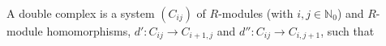 A double complex is a system $(C_{ij})$ of $R$-modules (with $i, j \in \mathbb{N}_0$) and $R$-module homomorphisms, $d' : C_{ij} \rightarrow C_{i+1,j}$ and $d'' : C_{ij} \rightarrow C_{i,j+1}$, such that
